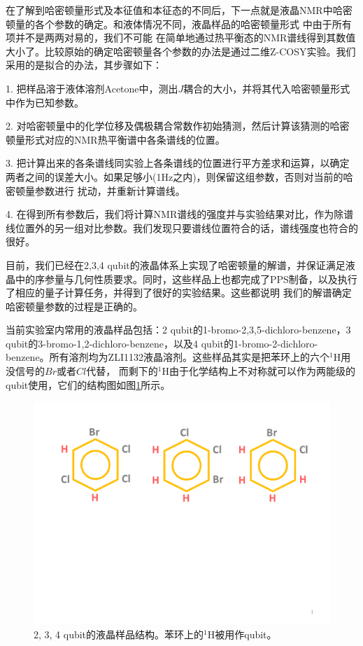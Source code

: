 在了解到哈密顿量形式及本征值和本征态的不同后，下一点就是液晶NMR中哈密顿量的各个参数的确定。和液体情况不同，液晶样品的哈密顿量形式
中由于所有项并不是两两对易的，我们不可能
在简单地通过热平衡态的NMR谱线得到其数值大小了。比较原始的确定哈密顿量各个参数的办法是通过二维Z-COSY实验\cite{lq2}。我们采用的是拟合的办法，其步骤如下：

1. 把样品溶于液体溶剂Acetone中，测出$J$耦合的大小，并将其代入哈密顿量形式中作为已知参数。

2. 对哈密顿量中的化学位移及偶极耦合常数作初始猜测，然后计算该猜测的哈密顿量形式对应的NMR热平衡谱中各条谱线的位置。

3. 把计算出来的各条谱线同实验上各条谱线的位置进行平方差求和运算，以确定两者之间的误差大小。如果足够小(1Hz之内)，则保留这组参数，否则对当前的哈密顿量参数进行
扰动，并重新计算谱线。

4. 在得到所有参数后，我们将计算NMR谱线的强度并与实验结果对比，作为除谱线位置外的另一组对比参数。我们发现只要谱线位置符合的话，谱线强度也符合的很好。

目前，我们已经在2,3,4 qubit的液晶体系上实现了哈密顿量的解谱，并保证满足液晶中的序参量与几何性质要求\cite{lq1}。同时，这些样品上也都完成了PPS制备，以及执行了相应的量子计算任务，并得到了很好的实验结果。这些都说明
我们的解谱确定哈密顿量参数的过程是正确的。

当前实验室内常用的液晶样品包括：2 qubit的1-bromo-2,3,5-dichloro-benzene，3 qubit的3-bromo-1,2-dichloro-benzene，以及4 qubit的1-bromo-2-dichloro-benzene。所有溶剂均为ZLI1132液晶溶剂。这些样品其实是把苯环上的六个$^1$H用没信号的$Br$或者$Cl$代替，
而剩下的$^1$H由于化学结构上不对称就可以作为两能级的qubit使用，它们的结构图如图\ref{lqsample}所示。

\begin{figure}[htbp]
            \begin{center}
              \includegraphics[width= 0.8\columnwidth]{figures/lqsample.pdf}
              \caption{2, 3, 4 qubit的液晶样品结构。苯环上的$^1$H被用作qubit。
              }
              \label{lqsample}
            \end{center}
\end{figure}

